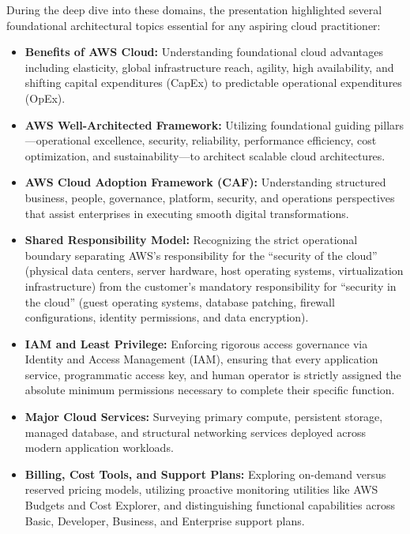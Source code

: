During the deep dive into these domains, the presentation highlighted
several foundational architectural topics essential for any aspiring
cloud practitioner:

\begin{itemize}
\tightlist
\item
  \textbf{Benefits of AWS Cloud:} Understanding foundational cloud
  advantages including elasticity, global infrastructure reach, agility,
  high availability, and shifting capital expenditures (CapEx) to
  predictable operational expenditures (OpEx).
\item
  \textbf{AWS Well-Architected Framework:} Utilizing foundational
  guiding pillars---operational excellence, security, reliability,
  performance efficiency, cost optimization, and sustainability---to
  architect scalable cloud architectures.
\item
  \textbf{AWS Cloud Adoption Framework (CAF):} Understanding structured
  business, people, governance, platform, security, and operations
  perspectives that assist enterprises in executing smooth digital
  transformations.
\item
  \textbf{Shared Responsibility Model:} Recognizing the strict
  operational boundary separating AWS's responsibility for the
  ``security of the cloud'' (physical data centers, server hardware,
  host operating systems, virtualization infrastructure) from the
  customer's mandatory responsibility for ``security in the cloud''
  (guest operating systems, database patching, firewall configurations,
  identity permissions, and data encryption).
\item
  \textbf{IAM and Least Privilege:} Enforcing rigorous access governance
  via Identity and Access Management (IAM), ensuring that every
  application service, programmatic access key, and human operator is
  strictly assigned the absolute minimum permissions necessary to
  complete their specific function.
\item
  \textbf{Major Cloud Services:} Surveying primary compute, persistent
  storage, managed database, and structural networking services deployed
  across modern application workloads.
\item
  \textbf{Billing, Cost Tools, and Support Plans:} Exploring on-demand
  versus reserved pricing models, utilizing proactive monitoring
  utilities like AWS Budgets and Cost Explorer, and distinguishing
  functional capabilities across Basic, Developer, Business, and
  Enterprise support plans.
\end{itemize}

